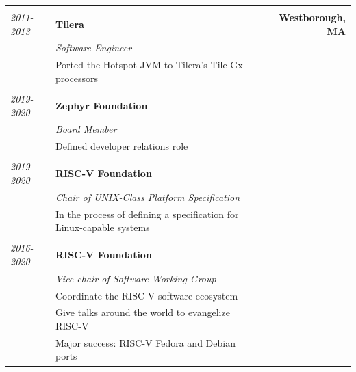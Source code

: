 \documentclass{letter}
\newcommand{\experience}[4]{&& \\
\textit{#1} \hspace{0.2in} & \textbf{#2} & \textbf{#3} \\
& \textit{#4} & \\}
\newcommand{\subexperience}[1]{& #1 & \\}
\begin{document}
\begin{tabular*}{\textwidth}{l l @{\extracolsep{\fill}} r}
  \experience{2011-2013}{Tilera}{Westborough, MA}{Software Engineer}
  \subexperience{Ported the Hotspot JVM to Tilera's Tile-Gx processors}

  \experience{2019-2020}{Zephyr Foundation}{}{Board Member}
  \subexperience{Defined developer relations role}

  \experience{2019-2020}{RISC-V Foundation}{}{Chair of UNIX-Class Platform Specification}
  \subexperience{In the process of defining a specification for Linux-capable systems}

  \experience{2016-2020}{RISC-V Foundation}{}{Vice-chair of Software Working Group}
  \subexperience{Coordinate the RISC-V software ecosystem}
  \subexperience{Give talks around the world to evangelize RISC-V}
  \subexperience{Major success: RISC-V Fedora and Debian ports}
\end{tabular*}\\
\vspace{0.2in}
\end{document}
